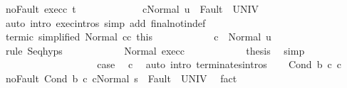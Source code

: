 \begin{isabellebody}
\ noFault\ exec{\isacharunderscore}c{}{\isacharprime}\ t{\isacharprime}\ \isanewline
\ \ \ \ \ \ \ \ \ \ \isamarkupfalse%
\ {\isachardoublequoteopen}{\isasymGamma}{\isasymturnstile}{\isasymlangle}c{}{\isacharprime}{\isacharcomma}Normal\ u\ {\isasymrangle}\ {\isasymRightarrow}{\isasymnotin}Fault\ {\isacharbackquote}\ UNIV{\isachardoublequoteclose}\isanewline
\ \ \ \ \ \ \ \ \ \ \ \ \isamarkupfalse%
\ {\isacharparenleft}auto\ intro{\isacharcolon}\ exec{\isachardot}intros\ simp\ add{\isacharcolon}\ final{\isacharunderscore}notin{\isacharunderscore}def{\isacharparenright}\isanewline
\ \ \ \ \ \ \ \ \ \ \isamarkupfalse%
\ termi{\isacharunderscore}c{}{\isacharprime}\ {\isacharbrackleft}simplified\ Normal{\isacharbrackright}\ c{}{\isacharunderscore}c{}{\isacharprime}\ this\isanewline
\ \ \ \ \ \ \ \ \ \ \isamarkupfalse%
\ {\isachardoublequoteopen}{\isasymGamma}{\isasymturnstile}c{}\ {\isasymdown}\ Normal\ u{\isachardoublequoteclose}\isanewline
\ \ \ \ \ \ \ \ \ \ \ \ \isamarkupfalse%
\ {\isacharparenleft}rule\ Seq{\isachardot}hyps{\isacharparenright}\isanewline
\ \ \ \ \ \ \ \ \ \ \isamarkupfalse%
\ Normal\ exec{\isacharunderscore}c{}\isanewline
\ \ \ \ \ \ \ \ \ \ \isamarkupfalse%
\ {\isacharquery}thesis\ \isamarkupfalse%
\ simp\isanewline
\ \ \ \ \ \ \ \ \isamarkupfalse%
\isanewline
\ \ \ \ \ \ \isamarkupfalse%
\isanewline
\ \ \ \ \isamarkupfalse%
\isanewline
\ \ \isacommand{{\isacharbraceright}}\isamarkupfalse%
\isanewline
\ \ \isamarkupfalse%
\ \isamarkupfalse%
\ {\isacharquery}case\ \isamarkupfalse%
\ c\ \isamarkupfalse%
\ {\isacharparenleft}auto\ intro{\isacharcolon}\ terminates{\isachardot}intros{\isacharparenright}\isanewline
{}\isamarkupfalse%
\isanewline
\ \ \isamarkupfalse%
\ {\isacharparenleft}Cond\ b\ c{}{\isacharprime}\ c{}{\isacharprime}{\isacharparenright}\isanewline
\ \ \isamarkupfalse%
\ noFault{\isacharcolon}\ {\isachardoublequoteopen}{\isasymGamma}{\isasymturnstile}{\isasymlangle}Cond\ b\ c{}{\isacharprime}\ c{}{\isacharprime}{\isacharcomma}Normal\ s\ {\isasymrangle}\ {\isasymRightarrow}{\isasymnotin}Fault\ {\isacharbackquote}\ UNIV{\isachardoublequoteclose}\ \isamarkupfalse%
\ fact\isanewline
\ \ \isamarkupfalse%

\end{isabellebody}
